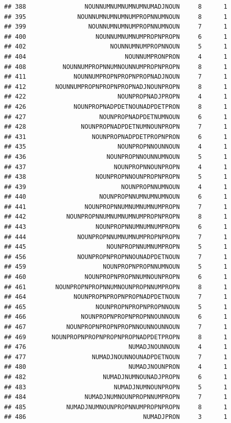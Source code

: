 \documentclass[]{article}
\begin{document}
\begin{verbatim}
## 388                NOUNNUMNUMNUMNUMNUMADJNOUN     8      1
## 395              NOUNNUMNUMNUMNUMPROPNNUMNOUN     8      1
## 399                 NOUNNUMNUMNUMPROPNNUMNOUN     7      1
## 400                   NOUNNUMNUMNUMPROPNPROPN     6      1
## 402                       NOUNNUMNUMPROPNNOUN     5      1
## 404                           NOUNNUMPRONPRON     4      1
## 408          NOUNNUMPROPNNUMNOUNNUMPROPNPROPN     8      1
## 411             NOUNNUMPROPNPROPNPROPNADJNOUN     7      1
## 412        NOUNNUMPROPNPROPNPROPNADJNOUNPROPN     8      1
## 422                         NOUNPROPNADJPROPN     4      1
## 426             NOUNPROPNADPDETNOUNADPDETPRON     8      1
## 427                    NOUNPROPNADPDETNUMNOUN     6      1
## 428               NOUNPROPNADPDETNUMNOUNPROPN     7      1
## 431                  NOUNPROPNADPDETPROPNPRON     6      1
## 435                         NOUNPROPNNOUNNOUN     4      1
## 436                      NOUNPROPNNOUNNUMNOUN     5      1
## 437                        NOUNPROPNNOUNPROPN     4      1
## 438                   NOUNPROPNNOUNPROPNPROPN     5      1
## 439                          NOUNPROPNNUMNOUN     4      1
## 440                    NOUNPROPNNUMNUMNUMNOUN     6      1
## 441                NOUNPROPNNUMNUMNUMNUMPROPN     7      1
## 442           NOUNPROPNNUMNUMNUMNUMPROPNPROPN     8      1
## 443                   NOUNPROPNNUMNUMNUMPROPN     6      1
## 444              NOUNPROPNNUMNUMNUMPROPNPROPN     7      1
## 445                      NOUNPROPNNUMNUMPROPN     5      1
## 456              NOUNPROPNPROPNNOUNADPDETNOUN     7      1
## 459                     NOUNPROPNPROPNNUMNOUN     5      1
## 460                NOUNPROPNPROPNNUMNOUNPROPN     6      1
## 461        NOUNPROPNPROPNNUMNOUNPROPNNUMPROPN     8      1
## 464             NOUNPROPNPROPNPROPNADPDETNOUN     7      1
## 465                   NOUNPROPNPROPNPROPNNOUN     5      1
## 466               NOUNPROPNPROPNPROPNNOUNNOUN     6      1
## 467           NOUNPROPNPROPNPROPNNOUNNOUNNOUN     7      1
## 469       NOUNPROPNPROPNPROPNPROPNADPDETPROPN     8      1
## 476                            NUMADJNOUNNOUN     4      1
## 477                  NUMADJNOUNNOUNADPDETNOUN     7      1
## 480                            NUMADJNOUNPRON     4      1
## 482                     NUMADJNUMNOUNADJPROPN     6      1
## 483                        NUMADJNUMNOUNPROPN     5      1
## 484                NUMADJNUMNOUNPROPNNUMPROPN     7      1
## 485           NUMADJNUMNOUNPROPNNUMPROPNPROPN     8      1
## 486                                NUMADJPRON     3      1

\end{verbatim}
\end{document}
